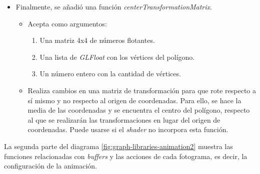 \begin{itemize}
    \item Finalmente, se añadió una función \textit{centerTransformationMatrix}.
        \begin{itemize}
            \item Acepta como argumentos:
                \begin{enumerate}
                    \item Una matriz 4x4 de números flotantes.
                    \item Una lista de \textit{GLFloat} con los vértices del polígono.
                    \item Un número entero con la cantidad de vértices.
                \end{enumerate}
            \item Realiza cambios en una matriz de transformación para que rote respecto a sí mismo y no respecto al origen de coordenadas. Para ello, se hace la media de las coordenadas y se encuentra el centro del polígono, respecto al que se realizarán las transformaciones en lugar del origen de coordenadas. Puede usarse si el \textit{shader} no incorpora esta función.
        \end{itemize}
    
\end{itemize}

La segunda parte del diagrama \ref{fig:graph-libraries-animation2}  muestra las funciones relacionadas con \textit{buffers} y las acciones de cada fotograma, es decir, la configuración de la animación.

